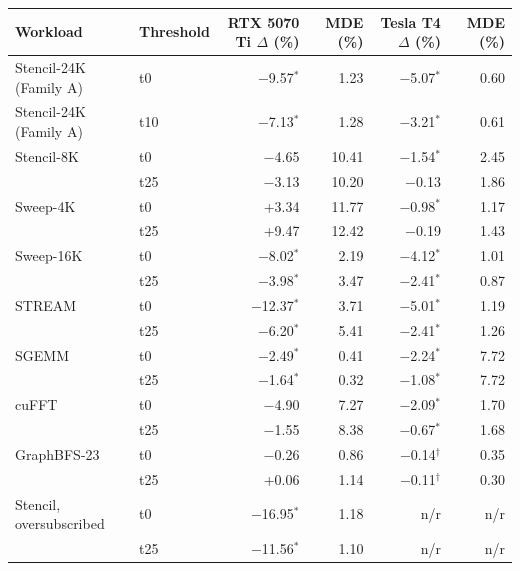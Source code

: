 \begin{tabular}{@{}llrrrr@{}}
\toprule
Workload & Threshold & RTX 5070 Ti $\Delta$ (\%) & MDE (\%) & Tesla T4 $\Delta$ (\%) & MDE (\%) \\
\midrule
Stencil-24K (Family A) & t0 & $-$9.57$^{*}$ & 1.23 & $-$5.07$^{*}$ & 0.60 \\ %
Stencil-24K (Family A) & t10 & $-$7.13$^{*}$ & 1.28 & $-$3.21$^{*}$ & 0.61 \\ %
\midrule
Stencil-8K & t0 & $-$4.65 & 10.41 & $-$1.54$^{*}$ & 2.45 \\ %
 & t25 & $-$3.13 & 10.20 & $-$0.13 & 1.86 \\ %
Sweep-4K & t0 & +3.34 & 11.77 & $-$0.98$^{*}$ & 1.17 \\ %
 & t25 & +9.47 & 12.42 & $-$0.19 & 1.43 \\ %
Sweep-16K & t0 & $-$8.02$^{*}$ & 2.19 & $-$4.12$^{*}$ & 1.01 \\ %
 & t25 & $-$3.98$^{*}$ & 3.47 & $-$2.41$^{*}$ & 0.87 \\ %
STREAM & t0 & $-$12.37$^{*}$ & 3.71 & $-$5.01$^{*}$ & 1.19 \\ %
 & t25 & $-$6.20$^{*}$ & 5.41 & $-$2.41$^{*}$ & 1.26 \\ %
SGEMM & t0 & $-$2.49$^{*}$ & 0.41 & $-$2.24$^{*}$ & 7.72 \\ %
 & t25 & $-$1.64$^{*}$ & 0.32 & $-$1.08$^{*}$ & 7.72 \\ %
cuFFT & t0 & $-$4.90 & 7.27 & $-$2.09$^{*}$ & 1.70 \\ %
 & t25 & $-$1.55 & 8.38 & $-$0.67$^{*}$ & 1.68 \\ %
GraphBFS-23 & t0 & $-$0.26 & 0.86 & $-$0.14$^{\dagger}$ & 0.35 \\ %
 & t25 & +0.06 & 1.14 & $-$0.11$^{\dagger}$ & 0.30 \\ %
Stencil, oversubscribed & t0 & $-$16.95$^{*}$ & 1.18 & n/r & n/r \\ %
 & t25 & $-$11.56$^{*}$ & 1.10 & n/r & n/r \\ %
\bottomrule
\end{tabular}

